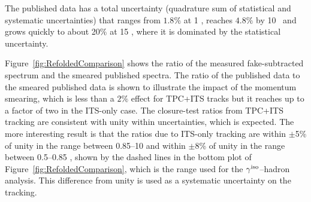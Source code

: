 The published data has a total uncertainty (quadrature sum of statistical and systematic uncertainties) that ranges from $1.8\%$ at 1 \GeVc, reaches $4.8\%$ by 10 \GeVc~and grows quickly to about 20$\%$ at 15 \GeVc, where it is dominated by the statistical uncertainty. 

Figure~\ref{fig:RefoldedComparison} shows the ratio of the measured fake-subtracted spectrum and the smeared published spectra. The ratio of the published data to the smeared published data is shown to illustrate the impact of the momentum smearing, which is less than a $2\%$ effect for TPC+ITS tracks but it reaches up to a factor of two in the ITS-only case. The closure-test ratios from TPC+ITS tracking are consistent with unity within uncertainties, which is expected. The more interesting result is that the ratios due to ITS-only tracking are within $\pm$5\% of unity in the range between 0.85--10 \GeVc and within $\pm$8\% of unity in the range between 0.5--0.85 \GeVc, shown by the dashed lines in the bottom plot of Figure~\ref{fig:RefoldedComparison}, which is the range used for the $\gamma^\mathrm{iso}$--hadron analysis. This difference from unity is used as a systematic uncertainty on the tracking.

